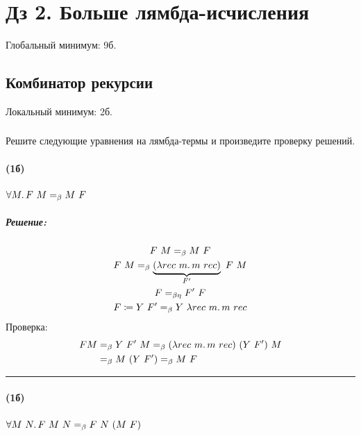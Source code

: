 \documentclass{article}
\newenvironment{proof}{\subparagraph{\hspace{-1em}Решение:\newline}\-}{\par\noindent\rule{\textwidth}{0.4pt}}
\newcommand{\eqbeta}{=_\beta}
\newcommand{\eqbetaeta}{=_{\beta\eta}}
\begin{document}
    \section*{Дз 2. Больше лямбда-исчисления}

    Глобальный минимум: 9б.

    \subsection{Комбинатор рекурсии}

    Локальный минимум: 2б.

    \subsubsection{}

    Решите следующие уравнения на лямбда-термы и произведите проверку решений.

    \paragraph{(1б)}

    $\forall M\ldotp F~M \eqbeta M~F$

    \begin{proof}
        \begin{gather}
            F~M \eqbeta M~F \\
            F~M \eqbeta \underbrace{(\lambda rec~m\ldotp m~rec)}_{F'}~F~M \\
            F \eqbetaeta F'~F \\
            F \coloneqq Y~F' \eqbeta Y~\lambda rec~m\ldotp m~rec
        \end{gather}
        Проверка:
        \begin{align}
            F M & \eqbeta Y~F'~M \eqbeta (\lambda rec~m\ldotp m~rec)~(Y~F')~M \\
                & \eqbeta M~(Y~F') \eqbeta M~F
        \end{align}
    \end{proof}

    \paragraph{(1б)}

    $\forall M~N\ldotp F~M~N \eqbeta F~N~(M~F)$
\end{document}
